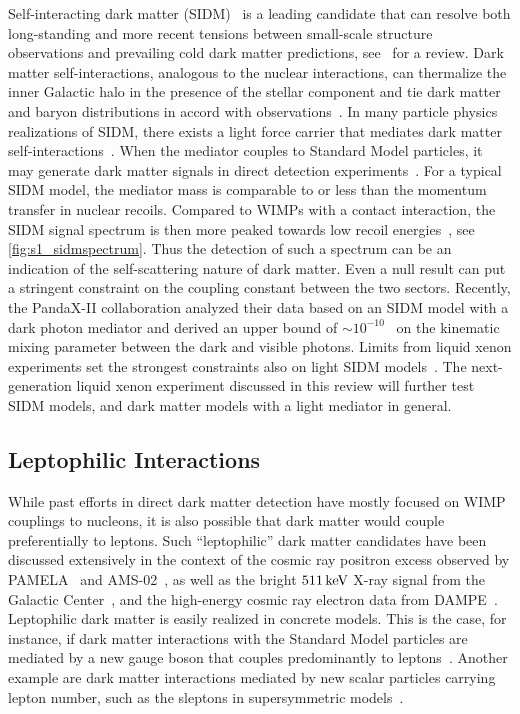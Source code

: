 Self-interacting dark matter (SIDM)~\cite{Spergel:1999mh,Kaplinghat:2015aga} is a leading candidate that can resolve both long-standing and more recent tensions between small-scale structure observations and prevailing cold dark matter predictions, see~\cite{Tulin:2017ara} for a review. Dark matter self-interactions, analogous to the nuclear interactions, can thermalize the inner Galactic halo in the presence of the stellar component and tie dark matter and baryon distributions in accord with observations~\cite{Kaplinghat:2013xca,Kamada:2016euw,Creasey:2016jaq,Ren:2018jpt}. In many particle physics realizations of SIDM, there exists a light force carrier that mediates dark matter self-interactions~\cite{Feng:2009hw, Buckley:2009in,Loeb:2010gj,Aarssen:2012fx,Tulin:2013teo,Kahlhoefer:2017umn,Chu:2018faw}. When the mediator couples to Standard Model particles, it may generate dark matter signals in direct detection experiments~\cite{Kaplinghat:2013yxa}. For a typical SIDM model, the mediator mass is comparable to or less than the momentum transfer in nuclear recoils. Compared to WIMPs with a contact interaction, the SIDM signal spectrum is then more peaked towards low recoil energies~\cite{DelNobile:2015uua,Kahlhoefer:2017ddj}, see \autoref{fig:s1_sidmspectrum}. Thus the detection of such a spectrum can be an indication of the self-scattering nature of dark matter. Even a null result can put a stringent constraint on the coupling constant between the two sectors. Recently, the PandaX-II collaboration analyzed their data based on an SIDM model with a dark photon mediator and derived an upper bound of $\sim10^{-10}$~\cite{Ren:2018gyx} on the kinematic mixing parameter between the dark and visible photons. Limits from liquid xenon experiments set the strongest constraints also on light SIDM models~\cite{Tsai:2020vpi}. The next-generation liquid xenon experiment discussed in this review will further test SIDM models, and dark matter models with a light mediator in general. 

\subsection{Leptophilic Interactions}

While past efforts in direct dark matter detection have mostly focused on WIMP couplings to nucleons, it is also possible that dark matter would couple preferentially to leptons. Such ``leptophilic'' dark matter candidates have been discussed extensively in the context of the cosmic ray positron excess observed by PAMELA~\cite{Adriani:2013uda} and AMS-02~\cite{Aguilar:2019owu}, as well as the bright $511\, \mathrm{keV}$ X-ray signal from the Galactic Center~\cite{Knodlseder:2005yq}, and the high-energy cosmic ray electron data from DAMPE~\cite{Ambrosi:2017wek}. Leptophilic dark matter is easily realized in concrete models. This is the case, for instance, if dark matter interactions with the Standard Model particles are mediated by a new gauge boson that couples predominantly to leptons~\cite{Fox:2008kb,Bell:2014tta}. Another example are dark matter interactions mediated by new scalar particles carrying lepton number, such as the sleptons in supersymmetric models~\cite{Chun:2009zx,Bringmann:2012vr,Agrawal:2014ufa,Kopp:2014tsa,Fukushima:2014yia}.

